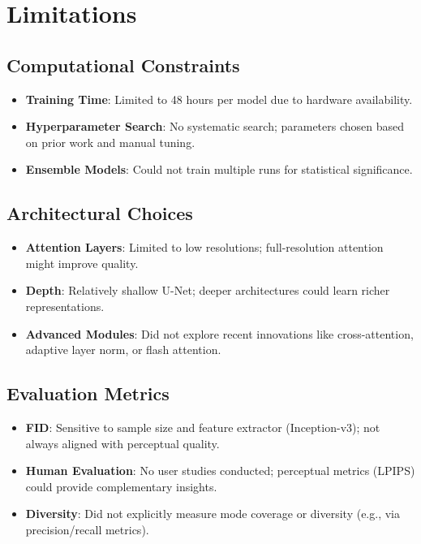 \documentclass[12pt]{report}
\theoremstyle{definition}
\begin{document}
\section{Limitations}

\subsection{Computational Constraints}

\begin{itemize}
\item \textbf{Training Time}: Limited to 48 hours per model due to hardware availability.
\item \textbf{Hyperparameter Search}: No systematic search; parameters chosen based on prior work and manual tuning.
\item \textbf{Ensemble Models}: Could not train multiple runs for statistical significance.
\end{itemize}

\subsection{Architectural Choices}

\begin{itemize}
\item \textbf{Attention Layers}: Limited to low resolutions; full-resolution attention might improve quality.
\item \textbf{Depth}: Relatively shallow U-Net; deeper architectures could learn richer representations.
\item \textbf{Advanced Modules}: Did not explore recent innovations like cross-attention, adaptive layer norm, or flash attention.
\end{itemize}

\subsection{Evaluation Metrics}

\begin{itemize}
\item \textbf{FID}: Sensitive to sample size and feature extractor (Inception-v3); not always aligned with perceptual quality.
\item \textbf{Human Evaluation}: No user studies conducted; perceptual metrics (LPIPS) could provide complementary insights.
\item \textbf{Diversity}: Did not explicitly measure mode coverage or diversity (e.g., via precision/recall metrics).
\end{itemize}
\end{document}
